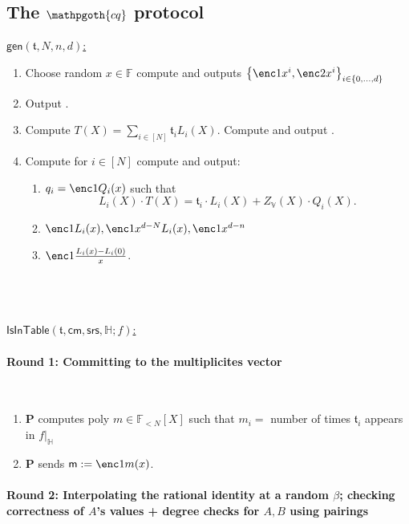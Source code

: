 \documentclass[11pt]{article} %
\newcommand{\cq}{\ensuremath{\mathpgoth{cq} }\xspace}
\newcommand{\F}{\ensuremath{\mathbb F}\xspace}
\newcommand{\srs}{\ensuremath{\mathsf{srs}}\xspace}
\newcommand{\cm}{\ensuremath{\mathsf{cm}}\xspace}
\newcommand{\defeq}{:=}
\newcommand{\sett}[2]{\ensuremath{\set{#1}_{#2}}\xspace}
\newcommand{\gen}{\ensuremath{\mathsf{gen}}\xspace}
\newcommand{\prv}{\ensuremath{\mathsf{\mathbf{P}}}\xspace}
\newcommand{\set}[1]{\ensuremath{\left\{#1\right\}}\xspace}
\newcommand{\polysofdeg}[1]{\ensuremath{\F_{< #1}[X]}\xspace}
\newcommand{\sumi}[1]{\sum_{i\in[#1]}}
\newcommand{\restricttoset}[2]{\ensuremath{#1|_{#2}}\xspace}
\newcommand{\isintable}{\ensuremath{\mathsf{IsInTable}}\xspace}
\newcommand{\subspace}{\ensuremath{\mathbb{H}}\xspace}
\newcommand{\bigspace}{\ensuremath{\mathbb{V}}\xspace}
\newcommand{\witsize}{\ensuremath{n}\xspace}
\newcommand{\tabsize}{\ensuremath{N}\xspace}
\newcommand{\tab}{\ensuremath{\mathfrak{t}}\xspace}
\newcommand{\m}{\ensuremath{\mathsf{m}}\xspace}
\begin{document}
\subsection{The \cq protocol}

\underline{$\gen(\tab,\tabsize,\witsize,d)$:}\\ \noindent
\begin{enumerate}
\item Choose random $x\in \F$ compute and outputs \sett{\enc1{x^i},\enc2{x^i}}{i\in \set{0,\ldots,d}}
\item Output \enc2{Z_\bigspace(x)}.
\item Compute $T(X)=\sumi{\tabsize}\tab_i L_i(X)$. Compute and output .
 \item Compute for $i\in [\tabsize]$ compute and output:
 \begin{enumerate}
  \item $q_i=\enc1{Q_i(x)}$ such that
  \[L_i(X)\cdot T(X)=\tab_i\cdot L_i(X) + Z_\bigspace(X)\cdot Q_i(X).\]
  \item $\enc1{L_i(x)},\enc1{x^{d-\tabsize}L_i(x)},\enc1{x^{d-\witsize}}$
  \item $\enc1{\frac{L_i(x)-L_i(0)}{x}}$.
 \end{enumerate}

\end{enumerate}

\noindent
\\
\\
\\
\noindent
\underline{$\isintable(\tab,\cm,\srs,\subspace;f)$:} \\ \noindent
\paragraph{\textbf{Round 1:} Committing to the multiplicites vector} \ \\
\begin{enumerate}
 \item \prv computes poly $m\in \polysofdeg{\tabsize}$ such that $m_i=$ number of times $\tab_i$ appears in \restricttoset{f}{\subspace}
 \item \prv sends $\m\defeq \enc1{m(x)}$.
 \end{enumerate}
	\paragraph{\textbf{Round 2:} Interpolating the rational identity at a random $\beta$; checking correctness of  $A$'s values + degree checks for $A,B$ using pairings} \ \\
 
\end{document}
